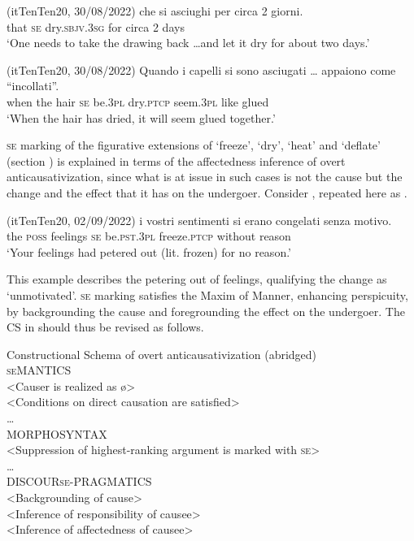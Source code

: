 \documentclass[output=paper,colorlinks,citecolor=brown
]{langscibook}
\begin{document}
\hspace*{\fill}(itTenTen20, 30/08/2022)\quad
\ea \label{bentley_example_55}
 che		si		asciughi					per		circa	2	giorni. \\
	{} that	\textsc{se}		dry.\textsc{sbjv}.3\textsc{sg}		for		circa	2	days \\
\glt 			‘One needs to take the drawing back \ldots  and let it dry for about two days.’
\z

\hspace*{\fill}(itTenTen20, 30/08/2022)\quad
\ea \label{bentley_example_56} 
\gll Quando		i			capelli	si		sono 		asciugati  {\ldots }	appaiono		come “incollati”. \\
	when				the	hair			\textsc{se}		be.3\textsc{pl}	dry.\textsc{ptcp}	{}					seem.3\textsc{pl}		like			glued  \\
\glt 			‘When the hair has dried, it will seem glued together.’
\z

\textsc{se} marking of the figurative extensions of ‘freeze’, ‘dry’, ‘heat’ and ‘deflate’ (section ) is explained in terms of the affectedness inference of overt anticausativization, since what is at issue in such cases is not the cause but the change and the effect that it has on the undergoer. Consider , repeated here as . 

\hspace*{\fill}(itTenTen20, 02/09/2022)\quad
\ea \label{bentley_example_57}
\gll  {\ldots}  i			vostri		sentimenti		si		erano 				congelati		senza			motivo.  \\
	{} 	the	\textsc{poss}			feelings				\textsc{se}		be.\textsc{pst}.3\textsc{pl}	freeze.\textsc{ptcp}	without	reason	 \\
\glt 			‘Your feelings had petered out (lit. frozen) for no reason.’	
\z

This example describes the petering out of feelings, qualifying the change as ‘unmotivated’. \textsc{se} marking satisfies the Maxim of Manner, enhancing perspicuity, by backgrounding the cause and foregrounding the effect on the undergoer. The CS in  should thus be revised as follows.

\ea \label{bentley_example_58}
Constructional Schema of overt anticausativization (abridged)\\
\textsc{se}MANTICS\\
<Causer is realized as \o>\\
<Conditions on direct causation are satisfied>\\
 \ldots \\
MORPHOSYNTAX\\
<Suppression of highest-ranking argument is marked with \textsc{se}>\\
 \ldots \\
DISCOUR\textsc{se}-PRAGMATICS\\
<Backgrounding of cause>\\
<Inference of responsibility of causee>\\
<Inference of affectedness of causee>\\
\z
\end{document}
